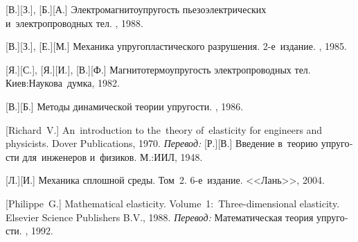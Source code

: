 \begin{thebibliography}{123}
\begin{otherlanguage}{russian}
[В.][З.], [Б.][А.] Электромагнитоупругость пьезоэлектрических и~электропроводных тел. \naukapublisher, 1988. 

[В.][З.], [Е.][М.] Механика упругопластического разрушения. 2\hbox{-}е~издание. \naukapublisher, 1985. 

[Я.][С.], [Я.][И.], [В.][Ф.]
Магнито\-термо\-упру\-гость электропроводных тел.
Киев:\;Наукова~думка, 1982.

[В.][Б.] Методы динамической теории упругости. \naukapublisher, 1986.

[Richard~V.]
An~introduction to the~theory of~elasticity for engineers and physicists.
Dover Publications, 1970.
\emph{Перевод:}
[Р.][В.]
Введение в~теорию упругости для~инженеров и~физиков.
М.:\;ИИЛ, 1948.

[Л.][И.] Механика сплошной среды. Том~2. 6\hbox{-}е~издание. <<Лань>>, 2004.

[Philippe~G.]
Mathematical elasticity.
Volume~1:~Three\hbox{-}dimensional elasticity.
Elsevier Science Publishers B.\hspace{.1ex}V\hspace{-0.2ex}.,
1988.
\emph{Перевод:}
Математическая теория упругости.
\mirpublisher,
1992.


\end{otherlanguage}
\end{thebibliography}
